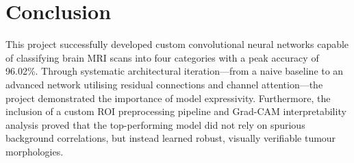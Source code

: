 \documentclass{article}
\begin{document}
\section{Conclusion}

This project successfully developed custom convolutional neural networks capable of classifying brain MRI scans into four categories with a peak accuracy of 96.02\%. Through systematic architectural iteration—from a naive baseline to an advanced network utilising residual connections and channel attention—the project demonstrated the importance of model expressivity. Furthermore, the inclusion of a custom ROI preprocessing pipeline and Grad-CAM interpretability analysis proved that the top-performing model did not rely on spurious background correlations, but instead learned robust, visually verifiable tumour morphologies.
\end{document}
